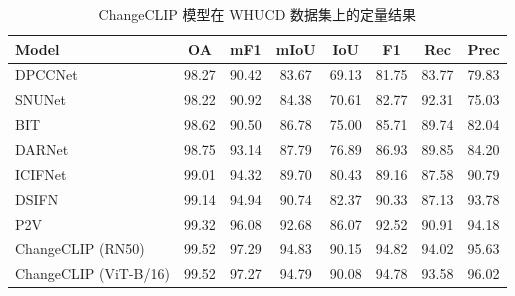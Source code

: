 \begin{table}[!htbp]
  \centering
  \caption{ChangeCLIP 模型在 WHUCD 数据集上的定量结果}
  \label{tab:changeclip_whucd}
  \begin{tabular}{@{}lccccccc@{}}
    \toprule
    Model                      & OA    & mF1   & mIoU  & IoU   & F1    & Rec   & Prec   \\
    \midrule
    DPCCNet~\cite{Papadomanolaki2021ADM}                    & 98.27 & 90.42 & 83.67 & 69.13 & 81.75 & 83.77 & 79.83  \\
    SNUNet~\cite{Fang2021SNUNetCDAD}                     & 98.22 & 90.92 & 84.38 & 70.61 & 82.77 & 92.31 & 75.03  \\
    BIT~\cite{chen_remote_2022}                        & 98.62 & 90.50 & 86.78 & 75.00 & 85.71 & 89.74 & 82.04  \\
    DARNet~\cite{li_densely_2022}                     & 98.75 & 93.14 & 87.79 & 76.89 & 86.93 & 89.85 & 84.20  \\
    ICIFNet~\cite{Feng2022ICIFNetIC}                    & 99.01 & 94.32 & 89.70 & 80.43 & 89.16 & 87.58 & 90.79  \\
    DSIFN~\cite{Zhang2020ADS}                      & 99.14 & 94.94 & 90.74 & 82.37 & 90.33 & 87.13 & 93.78  \\
    P2V~\cite{lin_transition_2023}                        & 99.32 & 96.08 & 92.68 & 86.07 & 92.52 & 90.91 & 94.18  \\
    ChangeCLIP (RN50)          & 99.52 & 97.29 & 94.83 & 90.15 & 94.82 & 94.02 & 95.63  \\
    ChangeCLIP (ViT-B/16)      & 99.52 & 97.27 & 94.79 & 90.08 & 94.78 & 93.58 & 96.02  \\
    \bottomrule
  \end{tabular}
\end{table}


